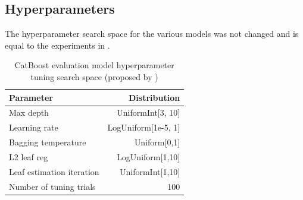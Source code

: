 \subsection{Hyperparameters}
The hyperparameter search space for the various models was not changed and is equal to the experiments in \cite{kotelnikov2022TabDDPMModellingTabular}.
\begin{table}[h]
	\centering
	\begin{tabular}{lr}
		\toprule
		Parameter                 & Distribution        \\
		\midrule
		Max depth                 & UniformInt[3, 10]   \\
		Learning rate             & LogUniform[1e-5, 1] \\
		Bagging temperature       & Uniform[0,1]        \\
		L2 leaf reg               & LogUniform[1,10]    \\
		Leaf estimation iteration & UniformInt[1,10]    \\
		\midrule
		Number of tuning trials   & 100                 \\
		\bottomrule
	\end{tabular}
	\caption[CatBoost Hyperparameter Search Space]{CatBoost evaluation model hyperparameter tuning search space (proposed by \cite{gorishniy2021RevisitingDeepLearning})}
	\label{tab:catboost_tune}
\end{table}

